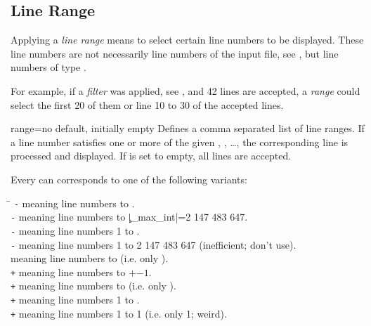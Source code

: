 \documentclass[a4paper,11pt]{ltxdoc}
\begin{document}

\clearpage
\subsection{Line Range}\label{subsec:linerange}

Applying a \emph{line range} means to select certain line numbers to be
displayed. These line numbers are not necessarily line numbers of
the input file, see , but line numbers of
type .

For example, if a \emph{filter} was applied, see ,
and 42 lines are accepted, a \emph{range} could select the first 20 of them or
line 10 to 30 of the accepted lines.


\begin{docCsvKey}[][doc new=2021-06-29]{range}{=}{no default, initially empty}
  Defines a comma separated list of line ranges. If a line number 
  satisfies one or more of the given , , \ldots,
  the corresponding line is processed and displayed.
  If  is set to empty, all lines are accepted.

  Every  can
  corresponds to one of the following variants:
  \begin{tabbing}
  \hspace*{2cm}\=\kill
  \texttt{-} \> meaning line numbers  to .\\
  \texttt{-}         \> meaning line numbers  to |\c_max_int|=2 147 483 647.\\
  \texttt{-}         \> meaning line numbers 1 to .\\
  \texttt{-}                 \> meaning line numbers 1 to 2 147 483 647 (inefficient; don't use).\\
  \texttt{}          \> meaning line numbers  to  (i.e. only ).\\
  \texttt{+} \> meaning line numbers  to $+$$-1$.\\
  \texttt{+}         \> meaning line numbers  to  (i.e. only ).\\
  \texttt{+}         \> meaning line numbers 1 to .\\
  \texttt{+}                 \> meaning line numbers 1 to 1 (i.e. only 1; weird).\\
  \end{tabbing}


\end{docCsvKey}
\end{document}
